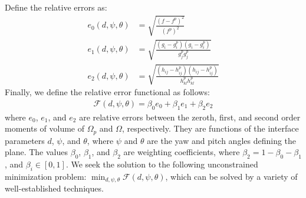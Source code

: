 Define the relative errors as:
\begin{align}
e_0(d,\psi,\theta) &=  \sqrt{\frac{(f - f^p)^2}{(f^p)^2}} \\
e_1(d,\psi,\theta) &=  \sqrt{\frac{(g_i - g_i^p)(g_i - g_i^p)}{g_j^{p}g_j^{p}}} \\
e_2(d,\psi,\theta) &=  \sqrt{\frac{(h_{ij} - h_{ij}^p)(h_{ij} - h_{ij}^p)}{h_{kl}^{p}h_{kl}^{p}}}
\end{align}
Finally, we define the relative error functional as follows:
\begin{align}
\mathcal{F}(d,\psi,\theta) = \beta_0e_0 + \beta_1e_1 + \beta_2e_2
\end{align}
where $e_0$, $e_1$, and $e_2$ are relative errors between the zeroth, first, and second order moments of volume of $\Omega_p$ and $\Omega$, respectively. They are functions of the interface parameters $d$, $\psi$, and $\theta$, where $\psi$ and $\theta$ are the yaw and pitch angles defining the plane. The values $\beta_0$, $\beta_1$, and $\beta_2$ are weighting coefficients, where $\beta_2 = 1 - \beta_0 - \beta_1$, and $\beta_i \in [0, 1]$. We seek the solution to the following unconstrained minimization problem: $\displaystyle \min_{d, \psi, \theta} \mathcal{F}(d,\psi,\theta)$, which can be solved by a variety of well-established techniques.

